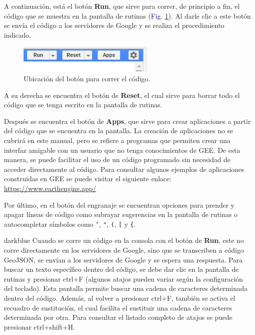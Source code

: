 \documentclass[
  12pt,
  letterpaper,
  twoside]{book}
\begin{document}
A continuación, está el botón \textbf{Run}, que sirve para correr, de principio a fin, el código que se muestra en la pantalla de rutinas (\textcolor{darkblue}{Fig.} \ref{fig:f215}). Al darle clic a este botón se envía el código a los servidores de Google y se realiza el procedimiento indicado.

\begin{figure}[H]

{\centering \includegraphics[width=0.5\linewidth]{Img/run} 

}

\caption{Ubicación del botón para correr el código.}\label{fig:f215}
\end{figure}

A su derecha se encuentra el botón de \textbf{Reset}, el cual sirve para borrar todo el código que se tenga escrito en la pantalla de rutinas.

Después se encuentra el botón de \textbf{Apps}, que sirve para crear aplicaciones a partir del código que se encuentra en la pantalla. La creación de aplicaciones no se cubrirá en este manual, pero se refiere a programas que permiten crear una interfaz amigable con un usuario que no tenga conocimientos de GEE. De esta manera, se puede facilitar el uso de un código programado sin necesidad de acceder directamente al código. Para consultar algunos ejemplos de aplicaciones construidas en GEE se puede visitar el siguiente enlace: \url{https://www.earthengine.app/}

Por último, en el botón del engranaje se encuentran opciones para prender y apagar líneas de código como subrayar sugerencias en la pantalla de rutinas o autocompletar símbolos como \texttt{’}, \texttt{"}, \texttt{(}, \texttt{{[}} y \texttt{\{}.

\begin{bluebox2}

\begin{awesomeblock}{5pt}{\faLightbulb}{darkblue}
Cuando se corre un código en la consola con el botón de \textbf{Run}, este no corre directamente en los servidores de Google, sino que se transcriben a código GeoJSON, se envían a los servidores de Google y se espera una respuesta.
Para buscar un texto específico dentro del código, se debe dar clic en la pantalla de rutinas y presionar ctrl+F (algunos atajos pueden variar según la configuración del teclado). Esta pantalla permite buscar una cadena de caracteres determinada dentro del código. Además, al volver a presionar ctrl+F, también se activa el recuadro de sustitución, el cual facilita el sustituir una cadena de caracteres determinada por otra. Para consultar el listado completo de atajos se puede presionar ctrl+shift+H.

\end{awesomeblock}

\end{bluebox2}
\end{document}
